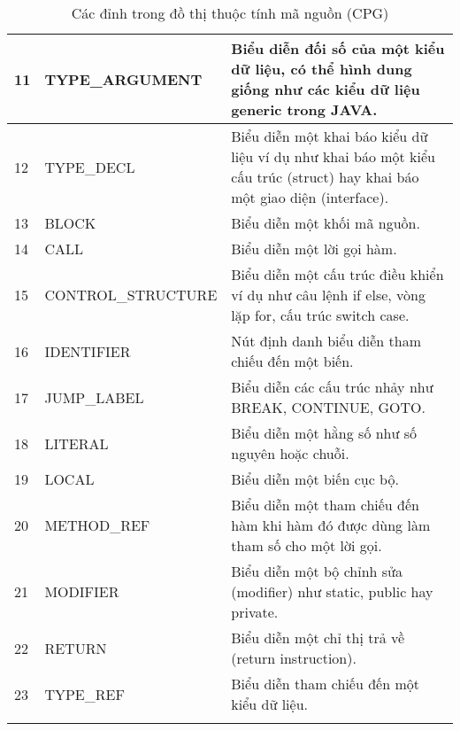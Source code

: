 \begin{longtable}{| p{} | p{} | p{} |}
11  & TYPE\_ARGUMENT     & Biểu diễn đối số của một kiểu dữ liệu, có thể hình dung giống như các kiểu dữ liệu generic trong JAVA.                                                          \\ \hline
12  & TYPE\_DECL         & Biểu diễn một khai báo kiểu dữ liệu ví dụ như khai báo một kiểu cấu trúc (struct) hay khai báo một giao diện (interface).                                       \\ \hline
13  & BLOCK             & Biểu diễn một khối mã nguồn.                                                                                                                                    \\ \hline
14  & CALL              & Biểu diễn một lời gọi hàm.                                                                                                                                      \\ \hline
15  & CONTROL\_STRUCTURE & Biểu diễn một cấu trúc điều khiển ví dụ như câu lệnh if else, vòng lặp for, cấu trúc switch case.                                                               \\ \hline
16  & IDENTIFIER        & Nút định danh biểu diễn tham chiếu đến một biến.                                                                                                                \\ \hline
17  & JUMP\_LABEL        & Biểu diễn các cấu trúc nhảy như BREAK, CONTINUE, GOTO.                                                                                                          \\ \hline
18  & LITERAL           & Biểu diễn một hằng số như số nguyên hoặc chuỗi.                                                                                                                 \\ \hline
19  & LOCAL             & Biểu diễn một biến cục bộ.                                                                                                                                      \\ \hline
20  & METHOD\_REF        & Biểu diễn một tham chiếu đến hàm khi hàm đó được dùng làm tham số cho một lời gọi.                                                                              \\ \hline
21  & MODIFIER          & Biểu diễn một bộ chỉnh sửa (modifier) như static, public hay private.                                                                                           \\ \hline
22  & RETURN            & Biểu diễn một chỉ thị trả về (return instruction).                                                                                                              \\ \hline
23  & TYPE\_REF          & Biểu diễn tham chiếu đến một kiểu dữ liệu.                                                                                                                      \\ \hline
\caption{Các đỉnh trong đồ thị thuộc tính mã nguồn (CPG)}
\label{table:method_nodecpgjoern}
\end{longtable}
\medskip

